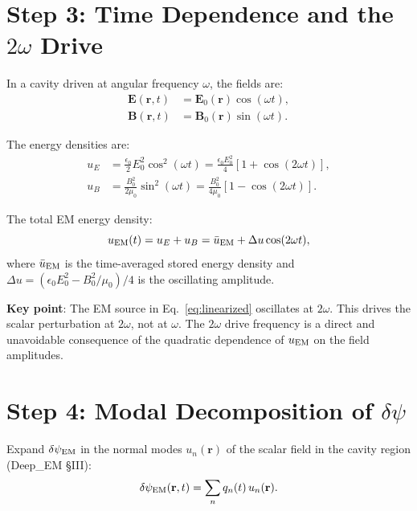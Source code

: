 \documentclass[11pt]{article}
\theoremstyle{definition}
\theoremstyle{remark}
\begin{document}
\section{Step 3: Time Dependence and the $2\omega$ Drive}
\label{sec:step3}

In a cavity driven at angular frequency $\omega$, the fields are:
\begin{align}
\mathbf{E}(\mathbf{r},t) &= \mathbf{E}_0(\mathbf{r})\cos(\omega t),\\
\mathbf{B}(\mathbf{r},t) &= \mathbf{B}_0(\mathbf{r})\sin(\omega t).
\end{align}

The energy densities are:
\begin{align}
u_E &= \frac{\epsilon_0}{2}E_0^2\cos^2(\omega t)
= \frac{\epsilon_0 E_0^2}{4}[1 + \cos(2\omega t)], \\
u_B &= \frac{B_0^2}{2\mu_0}\sin^2(\omega t)
= \frac{B_0^2}{4\mu_0}[1 - \cos(2\omega t)].
\end{align}

The total EM energy density:
\begin{equation}
u_{\rm EM}(t) = u_E + u_B = \bar{u}_{\rm EM}
+ \Delta u \cos(2\omega t),
\end{equation}
where $\bar{u}_{\rm EM}$ is the time-averaged stored energy density
and $\Delta u = (\epsilon_0 E_0^2 - B_0^2/\mu_0)/4$ is the
oscillating amplitude.

\textbf{Key point}: The EM source in Eq.~\eqref{eq:linearized}
oscillates at $2\omega$. This drives the scalar perturbation at
$2\omega$, not at $\omega$. The $2\omega$ drive frequency is a
direct and unavoidable consequence of the quadratic dependence of
$u_{\rm EM}$ on the field amplitudes.


\section{Step 4: Modal Decomposition of $\delta\psi$}
\label{sec:step4}

Expand $\delta\psi_{\rm EM}$ in the normal modes $u_n(\mathbf{r})$
of the scalar field in the cavity region (Deep\_EM \S III):
\begin{equation}
\delta\psi_{\rm EM}(\mathbf{r},t)
= \sum_n q_n(t)\,u_n(\mathbf{r}).
\end{equation}
\end{document}
